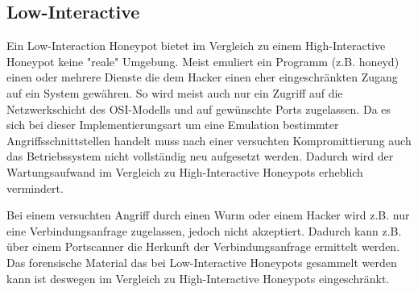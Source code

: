 \subsection{Low-Interactive}
Ein Low-Interaction Honeypot bietet im Vergleich zu einem High-Interactive Honeypot keine "reale" Umgebung. Meist emuliert ein Programm (z.B. honeyd) einen oder mehrere Dienste die dem Hacker einen eher eingeschränkten Zugang auf ein System gewähren. So wird meist auch nur ein Zugriff auf die Netzwerkschicht des OSI-Modells und auf gewünschte Ports zugelassen. Da es sich bei dieser Implementierungsart um eine Emulation bestimmter Angriffsschnittstellen handelt muss nach einer versuchten Kompromittierung auch das Betriebssystem nicht vollständig neu  aufgesetzt werden. Dadurch wird der Wartungsaufwand im Vergleich zu High-Interactive Honeypots erheblich vermindert.

Bei einem versuchten Angriff durch einen Wurm oder einem Hacker wird z.B. nur eine Verbindungsanfrage zugelassen, jedoch nicht akzeptiert. Dadurch kann z.B. über einem Portscanner die Herkunft der Verbindungsanfrage ermittelt werden. Das forensische Material das bei Low-Interactive Honeypots gesammelt werden kann ist deswegen im Vergleich zu High-Interactive Honeypots eingeschränkt. 